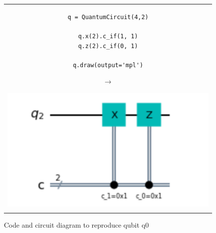 \begin{figure}[H]
\centering
\begin{tabular}{c}
\begin{minipage}[c]{.45\linewidth}
\begin{verbatim}
q = QuantumCircuit(4,2)

q.x(2).c_if(1, 1)
q.z(2).c_if(0, 1)

q.draw(output='mpl')
\end{verbatim}
\end{minipage}
\begin{minipage}[c]{.1\linewidth}
\centering
$\rightarrow$
\end{minipage}
\begin{minipage}[c]{.4\linewidth}
\centering
\includegraphics[width=\textwidth]{lab3/images/Step4.png}
\end{minipage}\\
\\ 
\end{tabular}
\caption{Code and circuit diagram to reproduce qubit q0}
\label{step4}
\end{figure}

